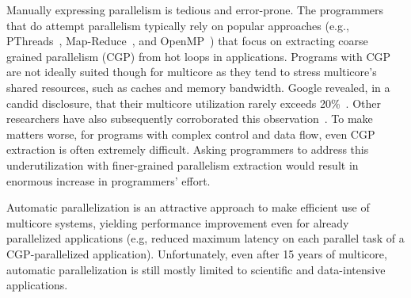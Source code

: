 
Manually expressing parallelism is tedious and error-prone. The programmers that
do attempt parallelism typically rely on popular approaches (e.g.,
PThreads~\cite{pthread:web}, Map-Reduce~\cite{dean:08:cacm}, and
OpenMP~\cite{openmp:web}) that focus on extracting coarse grained parallelism
(CGP) from hot loops in applications.
%
Programs with CGP are not ideally suited though for multicore as they tend to
stress multicore's shared resources, such as caches and memory bandwidth.
Google revealed, in a candid disclosure, that their multicore utilization rarely
exceeds 20\%~\cite{barroso:07:computer}. Other researchers have also
subsequently corroborated this observation~\cite{chung:13:isca}.
%
To make matters worse, for programs with complex control and data flow, even CGP
extraction is often extremely difficult.
%
Asking programmers to address this underutilization with finer-grained
parallelism extraction would result in enormous increase in programmers' effort.
%
%

Automatic parallelization is an attractive approach to make efficient use of
multicore systems, yielding performance improvement even for already parallelized
applications (e.g, reduced maximum latency on each parallel task of a
CGP-parallelized application). Unfortunately, even after 15 years of multicore,
automatic parallelization is still mostly limited to scientific and
data-intensive applications.

